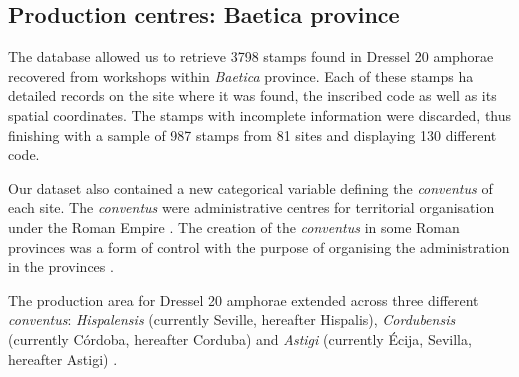 \documentclass[review]{elsarticle}
\newcommand{\memo}[2]{\textcolor{#1}{#2}}
\newcommand{\xavi}[1]{\memo{magenta}{XRC: #1\\}}
\begin{document}


\subsection{Production centres: Baetica province}


The database allowed us to retrieve 3798 stamps found in Dressel 20 amphorae recovered from workshops within \textit{Baetica} province. Each of these stamps ha detailed records on the site where it was found, the inscribed code as well as its spatial coordinates. The stamps with incomplete information were discarded, thus finishing with a sample of 987 stamps from 81 sites and displaying 130 different code.


Our dataset also contained a new categorical variable defining the \textit{conventus} of each site. The \textit{conventus} were administrative centres for territorial organisation under the Roman Empire \citep[58]{ozcariz_gil_administracion_2013}.
The creation of the \textit{conventus} in some Roman provinces was a form of control with the purpose of organising the administration in the provinces \citep{albertini_les_1923}.


The production area for Dressel 20 amphorae extended across three different \textit{conventus}: \textit{Hispalensis} (currently Seville, hereafter Hispalis), \textit{Cordubensis} (currently C\'ordoba, hereafter Corduba) and \textit{Astigi} (currently Écija, Sevilla, hereafter Astigi) \citep{rodriguez_economioleicola_1977,chicdatos2001,berni_millet_epigrafianforica_2008} . 
\end{document}

